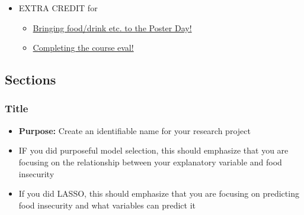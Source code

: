 \documentclass[
  letterpaper,
  DIV=11,
  numbers=noendperiod]{scrartcl}
\providecommand{\tightlist}{%
  \setlength{\itemsep}{0pt}\setlength{\parskip}{0pt}}
\begin{document}
\begin{itemize}
  \begin{itemize}
  \tightlist
  \item
    I will not be overly critical about the formatting
  \item
    By consistency, I mean that you if you are citing things like (Last
    Name, Year) it doesn't suddenly change to number citations.
  \item
    If you would like to use Quarto's citation tool, you can! I actually
    pair it with Zotero and it works beautifully! (But I would not
    embark on this if you haven't used Zotero before)
  \end{itemize}
\item
  EXTRA CREDIT for

  \begin{itemize}
  \tightlist
  \item
    \href{https://forms.office.com/Pages/ResponsePage.aspx?id=V3lz4rj6fk2U9pvWr59xWFMopmPUjRtDiHLswhgacNhUMzU0RkJVVThPNFZZUERNSkdWVlBBWTdEWCQlQCNjPTEu}{Bringing
    food/drink etc. to the Poster Day!}
  \item
    \href{https://forms.office.com/Pages/ResponsePage.aspx?id=V3lz4rj6fk2U9pvWr59xWFMopmPUjRtDiHLswhgacNhUQ1E0UDQ2QUhSRkpPV0JOMzY5TFA0QTUyMSQlQCNjPTEu}{Completing
    the course eval!}
  \end{itemize}
\end{itemize}

\subsection{Sections}\label{sections}

\subsubsection{Title}\label{title}

\begin{itemize}
\tightlist
\item
  \textbf{Purpose:} Create an identifiable name for your research
  project
\item
  IF you did {purposeful model selection}, this should emphasize that
  you are focusing on the relationship between your explanatory variable
  and food insecurity
\item
  If you did {LASSO}, this should emphasize that you are focusing on
  predicting food insecurity and what variables can predict it
\end{itemize}
\end{document}
